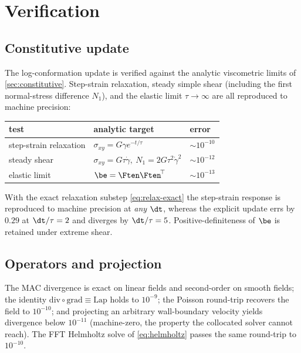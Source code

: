 \section{Verification}
\label{sec:verification}

\subsection{Constitutive update}
The log-conformation update is verified against the analytic viscometric limits of
\cref{sec:constitutive}. Step-strain relaxation, steady simple shear (including the
first normal-stress difference $N_1$), and the elastic limit $\tau\to\infty$ are all
reproduced to machine precision:
\begin{center}\small
\begin{tabular}{@{}lll@{}}
\toprule
test & analytic target & error \\
\midrule
step-strain relaxation & $\sigma_{xy}=G\gamma e^{-t/\tau}$ & $\sim10^{-10}$ \\
steady shear & $\sigma_{xy}=G\tau\dot\gamma,\ N_1=2G\tau^2\dot\gamma^2$ & $\sim10^{-12}$ \\
elastic limit & $\be=\Ften\Ften^{\!\top}$ & $\sim10^{-13}$ \\
\bottomrule
\end{tabular}
\end{center}
With the exact relaxation substep \cref{eq:relax-exact} the step-strain response is
reproduced to machine precision at \emph{any} $\dt$, whereas the explicit update errs by
$0.29$ at $\dt/\tau=2$ and diverges by $\dt/\tau=5$. Positive-definiteness of $\be$ is
retained under extreme shear.

\subsection{Operators and projection}
The MAC divergence is exact on linear fields and second-order on smooth fields; the
identity $\mathrm{div}\circ\mathrm{grad}\equiv\mathrm{Lap}$ holds to $10^{-9}$; the
Poisson round-trip recovers the field to $10^{-10}$; and projecting an arbitrary
wall-boundary velocity yields divergence below $10^{-11}$ (machine-zero, the property the
collocated solver cannot reach). The FFT Helmholtz solve of \cref{eq:helmholtz} passes
the same round-trip to $10^{-10}$.

